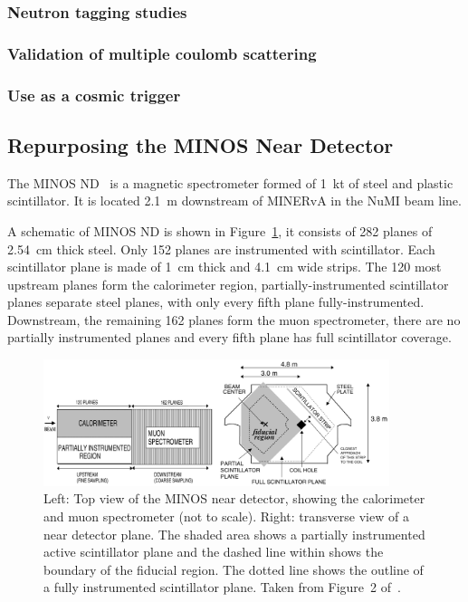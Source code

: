 \subsubsection{Neutron tagging studies}

\subsubsection{Validation of multiple coulomb scattering}

\subsubsection{Use as a cosmic trigger}

\subsection{Repurposing the MINOS Near Detector}


The MINOS ND~\cite{MINOS_NIM} is a magnetic spectrometer formed of \SI{1}{\kilo\tonne} of steel and plastic scintillator.
It is located \SI{2.1}{\metre} downstream of MINERvA in the NuMI beam line. 

A schematic of MINOS ND is shown in Figure~\ref{fig:minos_near_detector}, it consists of 282 planes of \SI{2.54}{\centi\metre} thick steel. Only 152 planes are instrumented with scintillator. Each scintillator plane is made of \SI{1}{\centi\metre} thick  and \SI{4.1}{\centi\metre} wide strips. 
The 120 most upstream planes form the calorimeter region, partially-instrumented scintillator planes separate steel planes, with only every fifth plane fully-instrumented. Downstream, the remaining 162 planes form the muon spectrometer, there are no partially instrumented planes and every fifth plane has full scintillator coverage. 

\begin{figure}[htb]
	\centering
	\includegraphics[width=0.9\textwidth]{plots/minos.png}
	\caption{Left: Top view of the MINOS near detector, showing the calorimeter and muon spectrometer (not to scale). Right: transverse view of a near detector plane. The shaded area shows a partially instrumented active scintillator plane and the dashed line within shows the boundary of the fiducial region. The dotted line shows the outline of a fully instrumented scintillator plane. Taken from Figure~2 of~\cite{MINOSDetectors}.}
	\label{fig:minos_near_detector}
\end{figure}

